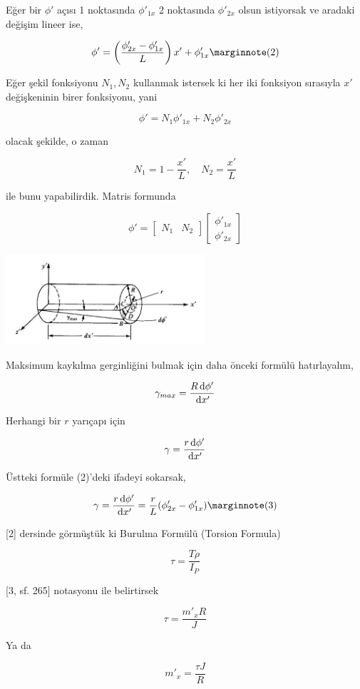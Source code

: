 \documentclass[12pt,fleqn]{article}\usepackage{../../common}
\begin{document}
Eğer bir $\phi'$ açısı 1 noktasında $\phi'_{1x}$ 2 noktasında $\phi'_{2x}$
olsun istiyorsak ve aradaki değişim lineer ise,

$$
\phi' = \left( \frac{\phi'_{2x} - \phi'_{1x}}{L}  \right) x' + \phi'_{1x}
\mlabel{2}
$$

Eğer şekil fonksiyonu $N_1,N_2$ kullanmak istersek ki her iki fonksiyon
sırasıyla $x'$ değişkeninin birer fonksiyonu, yani

$$
\phi' = N_1 \phi'_{1x} + N_2 \phi'_{2x}
$$

olacak şekilde, o zaman

$$
N_1 = 1 - \frac{x'}{L}, \quad N_2 = \frac{x'}{L}
$$

ile bunu yapabilirdik. Matris formunda

$$
\phi' = [\begin{array}{cc} N_1 & N_2 \end{array}]
\left[\begin{array}{c}
\phi'_{1x} \\ \phi'_{2x}
\end{array}\right]
$$

\includegraphics[width=20em]{compscieng_bpp43fem_03.jpg}

Maksimum kaykılma gerginliğini bulmak için daha önceki formülü hatırlayalım,

$$
\gamma_{max} = \frac{R \,\mathrm{d} \phi'}{\,\mathrm{d} x'}
$$

Herhangi bir $r$ yarıçapı için

$$
\gamma = \frac{r \,\mathrm{d} \phi'}{\,\mathrm{d} x'}
$$

Üstteki formüle (2)'deki ifadeyi sokarsak,

$$
\gamma =
\frac{r \ud \phi'}{\ud x'} =
\frac{r}{L} ( \phi'_{2x} - \phi'_{1x}  )
\mlabel{3}
$$

[2] dersinde görmüştük ki Burulma Formülü (Torsion Formula)

$$
\tau = \frac{T\rho}{I_P}
$$

[3, sf. 265] notasyonu ile belirtirsek 

$$
\tau = \frac{m'_x R}{J}
$$

Ya da

$$
m'_x = \frac{\tau J}{R}
$$
\end{document}
